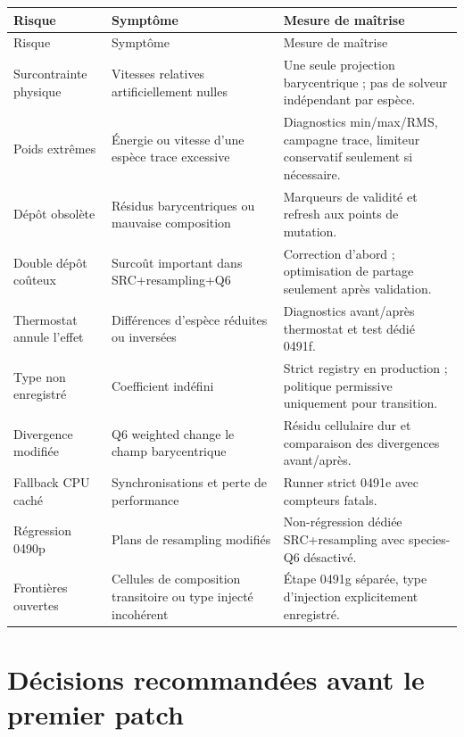\documentclass[11pt,a4paper]{article}
\begin{document}
\begin{longtable}{@{}p{}p{}p{}@{}}
\toprule
Risque & Symptôme & Mesure de maîtrise \\
\midrule
\endfirsthead
\toprule
Risque & Symptôme & Mesure de maîtrise \\
\midrule
\endhead
Surcontrainte physique & Vitesses relatives artificiellement nulles & Une seule projection barycentrique ; pas de solveur indépendant par espèce. \\
Poids extrêmes & Énergie ou vitesse d'une espèce trace excessive & Diagnostics min/max/RMS, campagne trace, limiteur conservatif seulement si nécessaire. \\
Dépôt obsolète & Résidus barycentriques ou mauvaise composition & Marqueurs de validité et refresh aux points de mutation. \\
Double dépôt coûteux & Surcoût important dans SRC+resampling+Q6 & Correction d'abord ; optimisation de partage seulement après validation. \\
Thermostat annule l'effet & Différences d'espèce réduites ou inversées & Diagnostics avant/après thermostat et test dédié 0491f. \\
Type non enregistré & Coefficient indéfini & Strict registry en production ; politique permissive uniquement pour transition. \\
Divergence modifiée & Q6 weighted change le champ barycentrique & Résidu cellulaire dur et comparaison des divergences avant/après. \\
Fallback CPU caché & Synchronisations et perte de performance & Runner strict 0491e avec compteurs fatals. \\
Régression 0490p & Plans de resampling modifiés & Non-régression dédiée SRC+resampling avec species-Q6 désactivé. \\
Frontières ouvertes & Cellules de composition transitoire ou type injecté incohérent & Étape 0491g séparée, type d'injection explicitement enregistré. \\
\bottomrule
\end{longtable}

\section{Décisions recommandées avant le premier patch}
\end{document}
